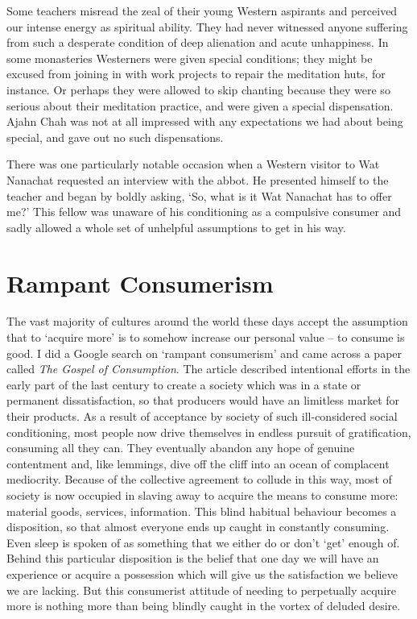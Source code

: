 Some teachers misread the zeal of their young Western aspirants and
perceived our intense energy as spiritual ability. They had never
witnessed anyone suffering from such a desperate condition of deep
alienation and acute unhappiness. In some monasteries Westerners were
given special conditions; they might be excused from joining in with
work projects to repair the meditation huts, for instance. Or perhaps
they were allowed to skip chanting because they were so serious about
their meditation practice, and were given a special dispensation. Ajahn
Chah was not at all impressed with any expectations we had about being
special, and gave out no such dispensations.

There was one particularly notable occasion when a Western visitor to
Wat Nanachat requested an interview with the abbot. He presented himself
to the teacher and began by boldly asking, ‘So, what is it Wat Nanachat
has to offer me?’ This fellow was unaware of his conditioning as a
compulsive consumer and sadly allowed a whole set of unhelpful
assumptions to get in his way.

\section{Rampant Consumerism}

The vast majority of cultures around the world these days accept the
assumption that to ‘acquire more’ is to somehow increase our personal
value – to consume is good. I did a Google search on ‘rampant
consumerism’ and came across a paper called \emph{The Gospel of
Consumption}.\cite{gospel}
The article described intentional efforts in the early part of the
last century to create a society which was in a state or permanent
dissatisfaction, so that producers would have an limitless market for
their products. As a result of acceptance by society of such
ill-considered social conditioning, most people now drive themselves in
endless pursuit of gratification, consuming all they can. They
eventually abandon any hope of genuine contentment and, like lemmings,
dive off the cliff into an ocean of complacent mediocrity. Because of
the collective agreement to collude in this way, most of society is now
occupied in slaving away to acquire the means to consume more: material
goods, services, information. This blind habitual behaviour becomes a
disposition, so that almost everyone ends up caught in constantly
consuming. Even sleep is spoken of as something that we either do or
don’t ‘get’ enough of. Behind this particular disposition is the belief
that one day we will have an experience or acquire a possession which
will give us the satisfaction we believe we are lacking. But this
consumerist attitude of needing to perpetually acquire more is nothing
more than being blindly caught in the vortex of deluded desire.

